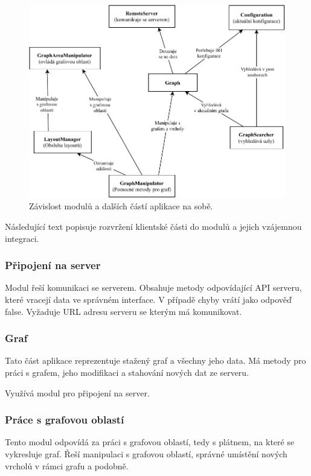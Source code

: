\begin{figure}[h]
    \centering
    \includegraphics[width=\textwidth]{media/dependencies.pdf}
    \caption{Závislost modulů a dalších částí aplikace na sobě. }
\end{figure}

Následující text popisuje rozvržení klientské části do modulů a jejich vzájemnou integraci.

\subsubsection{Připojení na server}
Modul řeší komunikaci se serverem. Obsahuje metody odpovídající API serveru, které vracejí data ve správném interface. V případě chyby vrátí jako odpověď false. Vyžaduje URL adresu serveru se kterým má komunikovat.

\subsubsection{Graf}
Tato část aplikace reprezentuje stažený graf a všechny jeho data. Má metody pro práci s grafem, jeho modifikaci a stahování nových dat ze serveru.

Využívá modul pro připojení na server.

\subsubsection{Práce s grafovou oblastí}
Tento modul odpovídá za práci s grafovou oblastí, tedy s plátnem, na které se vykresluje graf. Řeší manipulaci s grafovou oblastí, správné umístění nových vrcholů v rámci grafu a podobně.

